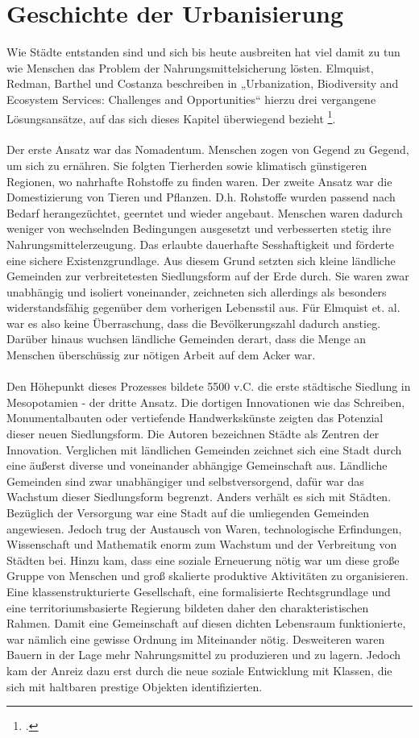 \documentclass{scrartcl}
\begin{document}
\section{Geschichte der Urbanisierung}

Wie Städte entstanden sind und sich bis heute ausbreiten hat viel damit zu tun wie Menschen das Problem der Nahrungsmittelsicherung lösten. Elmquist, Redman, Barthel und Costanza beschreiben in „Urbanization, Biodiversity and Ecosystem Services: Challenges and Opportunities“ hierzu drei vergangene Lösungsansätze, auf das sich dieses Kapitel überwiegend bezieht  \footcite[S.14ff]{Elmqvist2013}. 
\\
\\ 
Der erste Ansatz war das Nomadentum. Menschen zogen von Gegend zu Gegend, um sich zu ernähren. Sie folgten Tierherden sowie klimatisch günstigeren Regionen, wo nahrhafte Rohstoffe zu finden waren. Der zweite Ansatz war die Domestizierung von Tieren und Pflanzen. D.h. Rohstoffe wurden passend nach Bedarf herangezüchtet, geerntet und wieder angebaut. Menschen waren dadurch weniger von wechselnden Bedingungen ausgesetzt und verbesserten stetig ihre Nahrungsmittelerzeugung. Das erlaubte dauerhafte Sesshaftigkeit und förderte eine sichere Existenzgrundlage. Aus diesem Grund setzten sich kleine ländliche Gemeinden zur verbreitetesten Siedlungsform auf der Erde durch. Sie waren zwar unabhängig und isoliert voneinander, zeichneten sich allerdings als besonders widerstandsfähig gegenüber dem vorherigen Lebensstil aus. Für Elmquist et. al. war es also keine Überraschung, dass die Bevölkerungszahl dadurch anstieg. Darüber hinaus wuchsen ländliche Gemeinden derart, dass die Menge an Menschen überschüssig zur nötigen Arbeit auf dem Acker war. \\
\\
Den Höhepunkt dieses Prozesses bildete 5500 v.C. die erste städtische Siedlung in Mesopotamien - der dritte Ansatz. Die dortigen Innovationen wie das Schreiben, Monumentalbauten oder vertiefende Handwerkskünste zeigten das Potenzial dieser neuen Siedlungsform. Die Autoren bezeichnen Städte als Zentren der Innovation. Verglichen mit ländlichen Gemeinden zeichnet sich eine Stadt durch eine äußerst diverse und voneinander abhängige Gemeinschaft aus. Ländliche Gemeinden sind zwar unabhängiger und selbstversorgend, dafür war das Wachstum dieser Siedlungsform begrenzt. Anders verhält es sich mit Städten. Bezüglich der Versorgung war eine Stadt auf die umliegenden Gemeinden angewiesen. Jedoch trug der Austausch von Waren, technologische Erfindungen, Wissenschaft und Mathematik enorm zum Wachstum und der Verbreitung von Städten bei. Hinzu kam, dass eine soziale Erneuerung nötig war um diese große Gruppe von Menschen und groß skalierte produktive Aktivitäten zu organisieren. Eine klassenstrukturierte Gesellschaft, eine formalisierte Rechtsgrundlage und eine territoriumsbasierte Regierung bildeten daher den charakteristischen Rahmen. Damit eine Gemeinschaft auf diesen dichten Lebensraum funktionierte, war nämlich eine gewisse Ordnung im Miteinander nötig. Desweiteren waren Bauern in der Lage mehr Nahrungsmittel zu produzieren und zu lagern. Jedoch kam der Anreiz dazu erst durch die neue soziale Entwicklung mit Klassen, die sich mit haltbaren prestige Objekten identifizierten. 
\end{document}
